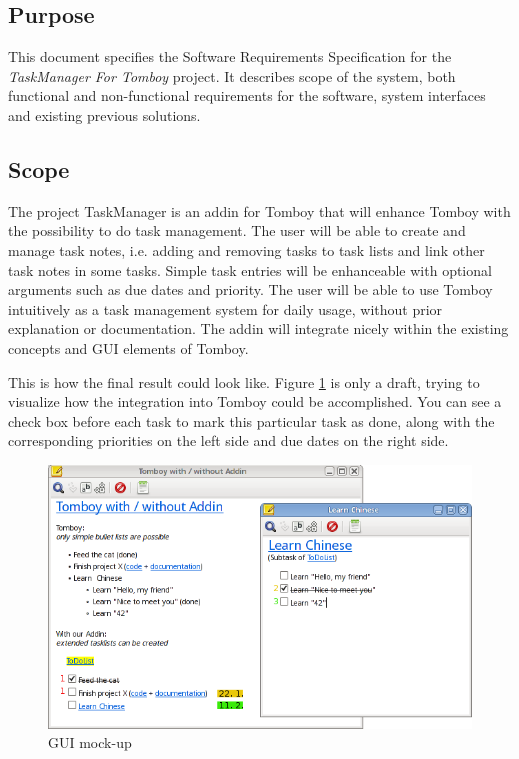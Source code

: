 \subsection{Purpose}
\label{intro:purpose}
This document specifies the Software Requirements Specification for the \textit{TaskManager For Tomboy} project.
It describes scope of the system, both functional and non-functional requirements for the software, system interfaces and existing previous solutions.


\subsection{Scope}
\label{intro:scope}
The project TaskManager is an addin for Tomboy that will enhance Tomboy with the possibility to do task management. 
The user will be able to create and manage task notes, i.e. adding and removing tasks to task lists and link other task notes in some tasks.
Simple task entries will be enhanceable with optional arguments such as due dates and priority.
The user will be able to use Tomboy intuitively as a task management system for daily usage, without prior explanation or documentation. 
The addin will integrate nicely within the existing concepts and GUI elements of Tomboy.

This is how the final result could look like. Figure \ref{gui} is only a draft, trying to visualize how the integration into Tomboy could be accomplished. You can see a check box before each task to mark this particular task as done, along with the corresponding priorities on the left side and due dates on the right side.
\begin{figure}[h]
  \includegraphics[width=\textwidth]{graphics/Screenshot_cropped_edited.png}
  \caption{GUI mock-up}
  \label{gui}
\end{figure}


